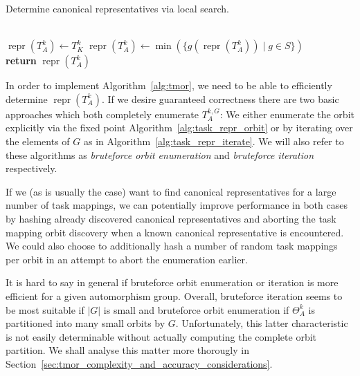 \begin{algorithm}
  \caption{Determine canonical representatives via local search.}
  \label{alg:task_repr_local_search}
  \begin{algorithmic}[1]
    \\
    \State $\operatorname{repr}(T_A^k) \gets T_K^k$
      \State $\operatorname{repr}(T_A^k) \gets
               \min(\{g(\operatorname{repr}(T_A^k)) \mid g \in S\})$
    \EndWhile
    \\
    \State \textbf{return} $\operatorname{repr}(T_A^k)$
  \EndProcedure
  \end{algorithmic}
\end{algorithm}

In order to implement Algorithm~\ref{alg:tmor}, we need to be
able to efficiently determine $\operatorname{repr}(T_A^k)$. If we desire
guaranteed correctness there are two basic approaches which both completely
enumerate $T_A^{k,G}$: We either enumerate the orbit explicitly via the fixed
point Algorithm~\ref{alg:task_repr_orbit} or by iterating over the elements of
$G$ as in Algorithm~\ref{alg:task_repr_iterate}. We will also refer to these
algorithms as \textit{bruteforce orbit enumeration} and \textit{bruteforce
iteration} respectively.

If we (as is usually the case) want to find canonical representatives for a
large number of task mappings, we can potentially improve performance in both
cases by hashing already discovered canonical representatives and aborting the
task mapping orbit discovery when a known canonical representative is
encountered. We could also choose to additionally hash a number of random task
mappings per orbit in an attempt to abort the enumeration earlier.

It is hard to say in general if bruteforce orbit enumeration or iteration is
more efficient for a given automorphism group.  Overall, bruteforce iteration
seems to be most suitable if $|G|$ is small and bruteforce orbit enumeration if
$\Theta_A^k$ is partitioned into many small orbits by $G$. Unfortunately, this
latter characteristic is not easily determinable without actually computing the
complete orbit partition.  We shall analyse this matter more thorougly in
Section~\ref{sec:tmor_complexity_and_accuracy_considerations}.

